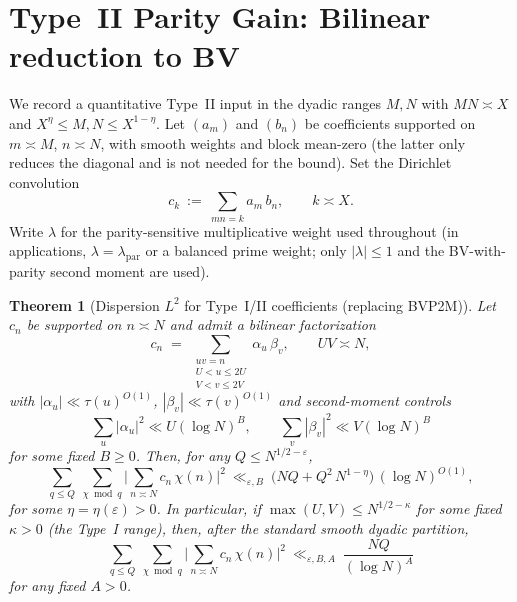 \documentclass[11pt]{article}
\newtheorem{theorem}[lemma]{Theorem}
\theoremstyle{definition}
\theoremstyle{remark}
\numberwithin{equation}{part}
\begin{document}
\section{Type~II Parity Gain: Bilinear reduction to BV}\label{sec:typeII}

We record a quantitative Type~II input in the dyadic ranges $M,N$ with $MN\asymp X$ and $X^\eta\le M,N\le X^{1-\eta}$.
Let $(a_m)$ and $(b_n)$ be coefficients supported on $m\asymp M$, $n\asymp N$, with smooth weights and block mean-zero (the latter only reduces the diagonal and is not needed for the bound). Set the Dirichlet convolution
\[
	c_k\ :=\ \sum_{mn=k} a_m\,b_n,\qquad k\asymp X.
\]
Write $\lambda$ for the parity-sensitive multiplicative weight used throughout (in applications, $\lambda=\lambda_{\mathrm{par}}$ or a balanced prime weight; only $|\lambda|\le 1$ and the BV-with-parity second moment are used).


\begin{theorem}[Dispersion $L^2$ for Type~I/II coefficients (replacing BVP2M)]\label{thm:BVP2M}
	Let $c_n$ be supported on $n\asymp N$ and admit a bilinear factorization
	\[
		c_n \;=\; \sum_{\substack{uv=n\\ U<u\le 2U\\ V<v\le 2V}} \alpha_u\,\beta_v,
		\qquad UV\asymp N,
	\]
	with $|\alpha_u|\ll \tau(u)^{O(1)}$, $|\beta_v|\ll \tau(v)^{O(1)}$ and second-moment controls
	\[
		\sum_{u} |\alpha_u|^2 \ll U(\log N)^B,\qquad \sum_{v} |\beta_v|^2 \ll V(\log N)^B
	\]
	for some fixed $B\ge 0$. Then, for any $Q\le N^{1/2-\varepsilon}$,
	\begin{equation}\label{eq:dispersion-second-moment}
		\sum_{q\le Q}\ \sum_{\chi\bmod q}
		\Big|\sum_{n\asymp N} c_n\,\chi(n)\Big|^2
		\ \ll_{\varepsilon,B}\ \bigl(NQ + Q^2\,N^{1-\eta}\bigr)\,(\log N)^{O(1)},
	\end{equation}
	for some $\eta=\eta(\varepsilon)>0$. In particular, if $\max(U,V)\le N^{1/2-\kappa}$ for some fixed $\kappa>0$ (the Type~I range), then, after the standard smooth dyadic partition,
	\begin{equation}\label{eq:dispersion-NQ}
		\sum_{q\le Q}\ \sum_{\chi\bmod q}
		\Big|\sum_{n\asymp N} c_n\,\chi(n)\Big|^2
		\ \ll_{\varepsilon,B,A}\ \frac{NQ}{(\log N)^A}
	\end{equation}
	for any fixed $A>0$.
\end{theorem}
\end{document}
